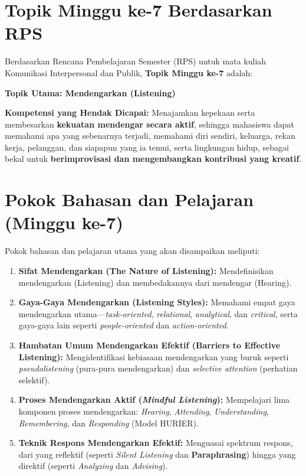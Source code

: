 \documentclass[
  letterpaper,
  DIV=11,
  numbers=noendperiod]{scrreprt}
\providecommand{\tightlist}{%
  \setlength{\itemsep}{0pt}\setlength{\parskip}{0pt}}
\begin{document}
\section{Topik Minggu ke-7 Berdasarkan
RPS}\label{topik-minggu-ke-7-berdasarkan-rps}

Berdasarkan Rencana Pembelajaran Semester (RPS) untuk mata kuliah
Komunikasi Interpersonal dan Publik, \textbf{Topik Minggu ke-7} adalah:

\textbf{Topik Utama: Mendengarkan (Listening)}

\textbf{Kompetensi yang Hendak Dicapai:} Menajamkan kepekaan serta
membesarkan \textbf{kekuatan mendengar secara aktif}, sehingga mahasiswa
dapat memahami apa yang sebenarnya terjadi, memahami diri sendiri,
keluarga, rekan kerja, pelanggan, dan siapapun yang ia temui, serta
lingkungan hidup, sebagai bekal untuk \textbf{berimprovisasi dan
mengembangkan kontribusi yang kreatif}.

\section{Pokok Bahasan dan Pelajaran (Minggu
ke-7)}\label{pokok-bahasan-dan-pelajaran-minggu-ke-7}

Pokok bahasan dan pelajaran utama yang akan disampaikan meliputi:

\begin{enumerate}
\def\labelenumi{\arabic{enumi}.}
\tightlist
\item
  \textbf{Sifat Mendengarkan (The Nature of Listening):} Mendefinisikan
  mendengarkan (Listening) dan membedakannya dari mendengar (Hearing).
\item
  \textbf{Gaya-Gaya Mendengarkan (Listening Styles):} Memahami empat
  gaya mendengarkan utama---\emph{task-oriented}, \emph{relational},
  \emph{analytical}, dan \emph{critical}, serta gaya-gaya lain seperti
  \emph{people-oriented} dan \emph{action-oriented}.
\item
  \textbf{Hambatan Umum Mendengarkan Efektif (Barriers to Effective
  Listening):} Mengidentifikasi kebiasaan mendengarkan yang buruk
  seperti \emph{pseudolistening} (pura-pura mendengarkan) dan
  \emph{selective attention} (perhatian selektif).
\item
  \textbf{Proses Mendengarkan Aktif (\emph{Mindful Listening}):}
  Mempelajari lima komponen proses mendengarkan: \emph{Hearing},
  \emph{Attending}, \emph{Understanding}, \emph{Remembering}, dan
  \emph{Responding} (Model HURIER).
\item
  \textbf{Teknik Respons Mendengarkan Efektif:} Menguasai spektrum
  respons, dari yang reflektif (seperti \emph{Silent Listening} dan
  \textbf{Paraphrasing}) hingga yang direktif (seperti \emph{Analyzing}
  dan \emph{Advising}).
\end{enumerate}
\end{document}
